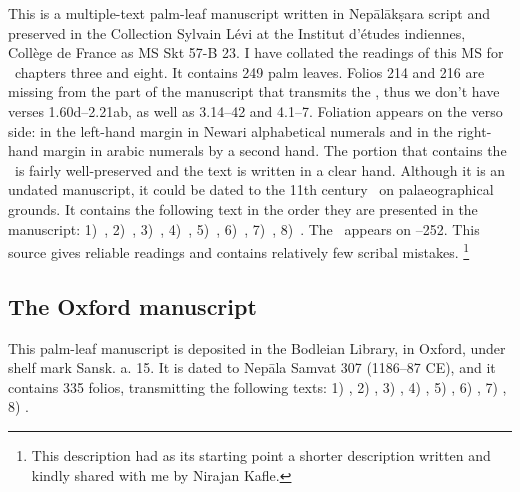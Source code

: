 This is a multiple-text palm-leaf manuscript written in 
Nepālākṣara script and preserved in the 
Collection Sylvain Lévi at the Institut d'études
indiennes, Collège de France as MS Skt 57-B 23. 
I have collated the readings of this MS for \VSS\ 
chapters three and eight.
It contains 249 palm leaves. %
Folios 214 and 216 are missing from the 
part of the manuscript that transmits the \VSS,
thus we don't have verses 1.60d--2.21ab, as well as
3.14--42 and 4.1--7.
Foliation appears on the verso side: in the left-hand margin in
Newari alphabetical numerals and in the right-hand margin 
in arabic numerals by a second hand. 
The portion that contains the \VSS\ is fairly well-preserved and
the text is written in a clear hand. Although it is an undated manuscript, it could be dated to the 11th century \CE\ on palaeographical grounds. 
It contains the following text in the order they are presented in the manuscript:
1)~\SDhS, %
2)~\SDhU, %
3)~\SDhSangr, %
4)~\Ums, %
5)~\SivaUp, %
6)~\Uums, %
7)~\Vss, %
8)~\DharmP. %
The \VSS\ appears on --252.
This source gives reliable readings and contains
relatively few scribal mistakes.%
	\footnote{This description had as its starting point a
			          shorter description written and kindly
			          shared with me by Nirajan Kafle.}








\medskip
\subsection{The Oxford manuscript}

This palm-leaf manuscript is deposited in the Bodleian Library, in Oxford, 
under shelf mark %
Sansk. a. 15. It is dated to Nepāla Samvat 307 (1186--87 CE),
and it contains 335 folios, transmitting the following texts: 
1) \SDhS, %
2) \SDhU,
3) \SDhSangr, %
4) \Ums, %
5) \SivaUp, %
6) \Uums, %
7) \Vss, %
8) \DharmP. %

